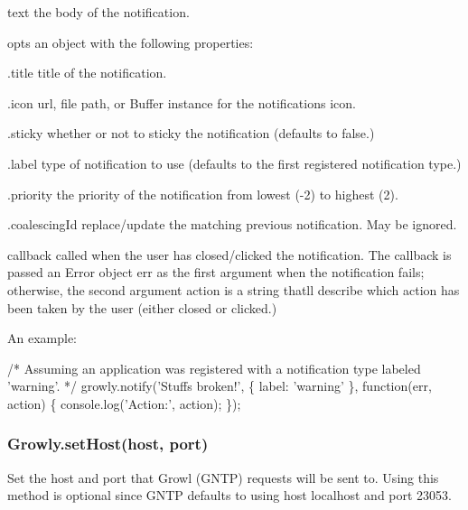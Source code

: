\begin{DoxyItemize}
\item {\ttfamily text} the body of the notification.
\item {\ttfamily opts} an object with the following properties\+:
\begin{DoxyItemize}
\item {\ttfamily .title} title of the notification.
\item {\ttfamily .icon} url, file path, or Buffer instance for the notification\textquotesingle{}s icon.
\item {\ttfamily .sticky} whether or not to sticky the notification (defaults to false.)
\item {\ttfamily .label} type of notification to use (defaults to the first registered notification type.)
\item {\ttfamily .priority} the priority of the notification from lowest (-\/2) to highest (2).
\item {\ttfamily .coalescing\+Id} replace/update the matching previous notification. May be ignored.
\end{DoxyItemize}
\item {\ttfamily callback} called when the user has closed/clicked the notification. The callback is passed an Error object {\ttfamily err} as the first argument when the notification fails; otherwise, the second argument {\ttfamily action} is a string that\textquotesingle{}ll describe which action has been taken by the user (either \textquotesingle{}closed\textquotesingle{} or \textquotesingle{}clicked\textquotesingle{}.)
\end{DoxyItemize}

An example\+:


\begin{DoxyCode}
/* Assuming an application was registered with a notification type labeled 'warning'. */
growly.notify('Stuffs broken!', \{ label: 'warning' \}, function(err, action) \{
    console.log('Action:', action);
\});
\end{DoxyCode}


\subsubsection*{Growly.\+set\+Host(host, port)}

Set the host and port that Growl (G\+N\+TP) requests will be sent to. Using this method is optional since G\+N\+TP defaults to using host \textquotesingle{}localhost\textquotesingle{} and port 23053.

